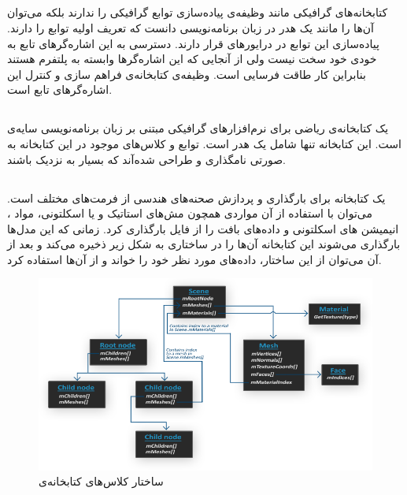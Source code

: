 \subsection{}
کتابخانه‌های گرافیکی مانند
وظیفه‌‌ی پیاده‌سازی توابع گرافیکی را ندارند بلکه می‌توان آن‌ها را مانند یک هدر در زبان 
برنامه‌نویسی 
دانست که تعریف اولیه توابع را دارند. پیاده‌سازی این توابع در درایور‌های 
قرار دارند.
دسترسی به این اشاره‌گر‌‌های تابع به خودی خود سخت نیست ولی از آنجایی که این اشاره‌گرها وابسته به پلتفرم هستند بنابراین کار طاقت فرسایی است. 
وظیفه‌ی کتابخانه‌ی 
فراهم سازی و کنترل این اشاره‌گرهای تابع است.
\cite{GLAD}


\subsection{}
یک کتابخانه‌ی ریاضی برای نرم‌افزارهای گرافیکی مبتنی بر زبان برنامه‌نویسی سایه‌ی 
است. این کتابخانه تنها شامل یک هدر 
است.
توابع و کلاس‌های موجود در این کتابخانه به صورتی نامگذاری و طراحی شده‌آند که بسیار به 
 نزدیک باشند.


 \subsection{}

 یک کتابخانه برای بارگذاری و پردازش صحنه‌های هندسی از فرمت‌های مختلف است.
 می‌توان با استفاده از آن مواردی همچون مش‌های استاتیک و یا اسکلتونی، مواد 
 ، انیمیشن های اسکلتونی و داده‌‌های بافت را از فایل بارگذاری کرد.
زمانی که این مدل‌ها بارگذاری می‌شوند این کتابخانه آن‌ها را در ساختاری به شکل زیر ذخیره می‌کند و بعد از آن می‌توان از این ساختار، داده‌های مورد نظر خود را خواند و از آن‌ها استفاده کرد.
\cite{Assimp} \cite{LearnOpenGL_Assimp}

\begin{figure}[ht]
	\centerline{\includegraphics[width=\textwidth,height=\textheight,keepaspectratio]{Figures/Ch5/assimp_structure.png}}

	\caption{ساختار کلاس‌های کتابخانه‌ی  \cite{LearnOpenGL_Assimp}}
	\label{fig:Assimp}
  \end{figure}
  


